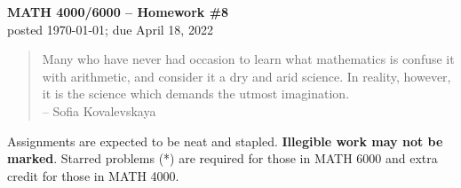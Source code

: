 \documentclass[11pt]{article}
\theoremstyle{plain}
\theoremstyle{remark}
\begin{document}
\thispagestyle{empty} \begin{center} {\textbf{MATH 4000/6000 --
Homework \#8}\\ posted \today; due April 18, 2022}
\end{center}

\begin{quote} {\scriptsize Many who have never had occasion to learn what mathematics is confuse it with arithmetic, and consider it a dry and arid science. In reality, however, it is the science which demands the utmost imagination.
\\
-- Sofia Kovalevskaya}
\end{quote}

\noindent Assignments are expected to be neat and stapled. \textbf{Illegible work may not be marked}. Starred problems (*) are required for those in MATH 6000 and extra credit for those in MATH 4000.
\end{document}
